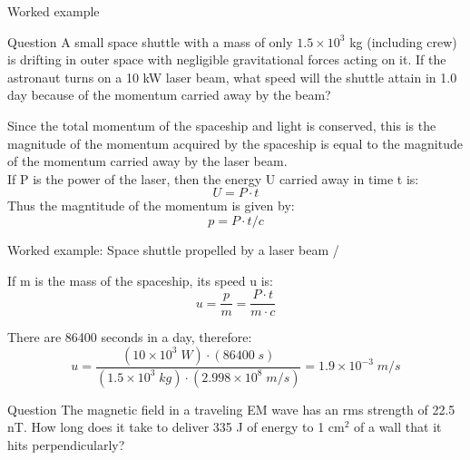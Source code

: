 
%
%

{
\problemslide

%
%
%
%

\begin{frame}{Worked example}

\begin{blockexmplque}{Question}
  A small space shuttle with a mass of only $1.5 \times 10^3$ kg
  (including crew) is drifting in outer space with negligible
  gravitational forces acting on it. If the astronaut turns
  on a 10 kW laser beam, what speed will the shuttle attain in 1.0 day
  because of the momentum carried away by the beam?
\end{blockexmplque}

Since the total momentum of the spaceship and light is conserved,
this is the magnitude of the momentum acquired by the spaceship
is equal to the magnitude of the momentum carried away by the laser beam.\\
\vspace{0.2cm}
If P is the power of the laser, then the energy U carried away in time t is:
\begin{equation*}
   U = P \cdot t
\end{equation*}
Thus the magntitude of the momentum is given by:
\begin{equation*}
   p = P \cdot t/c
\end{equation*}

\end{frame}

%
%
%
%

\begin{frame}{Worked example: Space shuttle propelled by a laser beam /}

If m is the mass of the spaceship, its speed u is:
\begin{equation*}
  u = \frac{p}{m} = \frac{P \cdot t}{m \cdot c}
\end{equation*}

There are 86400 seconds in a day, therefore:
\begin{equation*}
  u = \frac{(10 \times 10^3 \; W)
      \cdot (86400 \; s)}{(1.5 \times 10^3 \; kg)
      \cdot (2.998\times 10^8 \; m/s)}
    = 1.9 \times 10^{-3} \; m/s
\end{equation*}

%
%
%

\begin{blockexmplque}{Question}
  The magnetic field in a traveling EM wave has an rms
  strength of 22.5 nT. How long does it take to deliver 335 J of
  energy to 1 cm$^2$ of a wall that it hits perpendicularly?
\end{blockexmplque}


\end{frame}}

